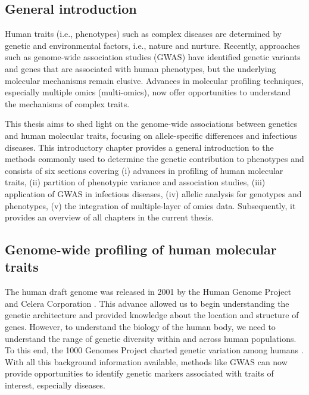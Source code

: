 \documentclass{book}
\begin{document}
\renewcommand{\thetable}{\textbf{Table \arabic{chapter}.\arabic{table}}}
\renewcommand{\thefigure}{\textbf{Figure \arabic{chapter}.\arabic{figure}}}

\begin{refsection} %

\chapter{General introduction}

\newpage

Human traits (i.e., phenotypes) such as complex diseases are determined by genetic and environmental factors, i.e., nature and nurture.
Recently, approaches such as genome-wide association studies (GWAS) have identified genetic variants and genes that are associated with human phenotypes, but the underlying molecular mechanisms remain elusive.
Advances in molecular profiling techniques, especially multiple omics (multi-omics), now offer opportunities to understand the mechanisms of complex traits.

This thesis aims to shed light on the genome-wide associations between genetics and human molecular traits, focusing on allele-specific differences and infectious diseases.
This introductory chapter provides a general introduction to the methods commonly used to determine the genetic contribution to phenotypes and consists of six sections covering (i) advances in profiling of human molecular traits, (ii) partition of phenotypic variance and association studies, (iii) application of GWAS in infectious diseases, (iv) allelic analysis for genotypes and phenotypes, (v) the integration of multiple-layer of omics data.
Subsequently, it provides an overview of all chapters in the current thesis.

\section*{Genome-wide profiling of human molecular traits}
The human draft genome was released in 2001 by the Human Genome Project and Celera Corporation \cite{Author2004Finishing}.
This advance allowed us to begin understanding the genetic architecture and provided knowledge about the location and structure of genes.
However, to understand the biology of the human body, we need to understand the range of genetic diversity within and across human populations.
To this end, the 1000 Genomes Project charted genetic variation among humans \cite{Genome2012An}.
With all this background information available, methods like GWAS can now provide opportunities to identify genetic markers associated with traits of interest, especially diseases.


\end{refsection}
\end{document}
